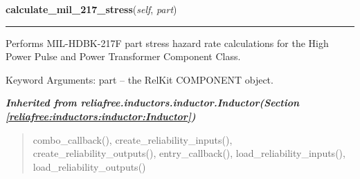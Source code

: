 \hspace{.8\funcindent}\begin{boxedminipage}{\funcwidth}

    \raggedright \textbf{calculate\_mil\_217\_stress}(\textit{self}, \textit{part})

    \vspace{-1.5ex}

    \rule{\textwidth}{0.5\fboxrule}
\setlength{\parskip}{2ex}
    Performs MIL-HDBK-217F part stress hazard rate calculations for the 
    High Power Pulse and Power Transformer Component Class.

    Keyword Arguments: part -- the RelKit COMPONENT object.

\setlength{\parskip}{1ex}
    \end{boxedminipage}


\large{\textbf{\textit{Inherited from reliafree.inductors.inductor.Inductor\textit{(Section \ref{reliafree:inductors:inductor:Inductor})}}}}

\begin{quote}
combo\_callback(), create\_reliability\_inputs(), create\_reliability\_outputs(), entry\_callback(), load\_reliability\_inputs(), load\_reliability\_outputs()
\end{quote}
